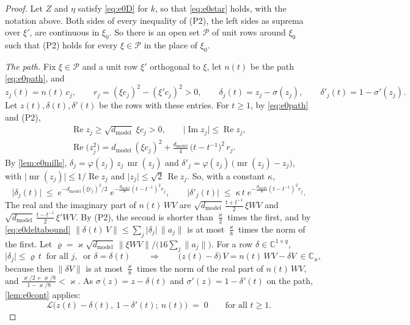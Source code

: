 \documentclass[10pt]{article}
\theoremstyle{definition}
\theoremstyle{remark}
\newcommand{\dm}{d_{\mathrm{model}}}
\newcommand{\norm}[1]{\lVert #1\rVert}
\begin{document}
\begin{proof}
Let $Z$ and $\eta$ satisfy \eqref{eq:e0D} for $k$, so that \eqref{eq:e0star} holds, with the notation above. Both sides of every inequality of (P2), the left sides as suprema over $\xi'$, are continuous in $\xi_0$. So there is an open set $\mathcal P$ of unit rows around $\xi_0$ such that (P2) holds for every $\xi \in \mathcal P$ in the place of $\xi_0$.

\emph{The path.} Fix $\xi \in \mathcal P$ and a unit row $\xi'$ orthogonal to $\xi$, let $n(t)$ be the path \eqref{eq:e0path}, and
\[
z_j(t) = n(t)\,c_j, \qquad r_j = (\xi c_j)^2 - (\xi'c_j)^2 > 0, \qquad \delta_j(t) = z_j - \sigma(z_j), \qquad \delta'_j(t) = 1 - \sigma'(z_j).
\]
Let $z(t), \delta(t), \delta'(t)$ be the rows with these entries. For $t \ge 1$, by \eqref{eq:e0path} and (P2),
\begin{equation}\label{eq:e0zfacts}
\begin{gathered}
\operatorname{Re}z_j \ge \sqrt{\dm}\;\xi c_j > 0, \qquad \lvert\operatorname{Im}z_j\rvert \le \operatorname{Re}z_j, \\
\operatorname{Re}\big(z_j^2\big) = \dm\,(\xi c_j)^2 + \frac{\dm}{4}\,\big(t - t^{-1}\big)^2\,r_j .
\end{gathered}
\end{equation}
By \cref{lem:e0mills}, $\delta_j = \varphi(z_j)\,z_j\,\operatorname{mr}(z_j)$ and $\delta'_j = \varphi(z_j)\,\big(\operatorname{mr}(z_j) - z_j\big)$, with $\lvert\operatorname{mr}(z_j)\rvert \le 1/\operatorname{Re}z_j$ and $\lvert z_j\rvert \le \sqrt2\,\operatorname{Re}z_j$. So, with a constant $\kappa$,
\begin{equation}\label{eq:e0deltabound}
\lvert\delta_j(t)\rvert \;\le\; e^{-\dm(\xi c_j)^2/2}\;e^{-\frac{\dm}{8}(t - t^{-1})^2r_j}, \qquad \lvert\delta'_j(t)\rvert \;\le\; \kappa\,t\;e^{-\frac{\dm}{8}(t - t^{-1})^2r_j} .
\end{equation}
The real and the imaginary part of $n(t)\,WV$ are $\sqrt{\dm}\,\frac{t + t^{-1}}{2}\,\xi WV$ and $\sqrt{\dm}\,\frac{t - t^{-1}}{2}\,\xi'WV$. By (P2), the second is shorter than $\frac{\varkappa}{2}$ times the first, and by \eqref{eq:e0deltabound} $\norm{\delta(t)\,V} \le \sum_j\lvert\delta_j\rvert\,\norm{a_j}$ is at most $\frac{\varkappa}{8}$ times the norm of the first. Let $\varrho = \varkappa\sqrt{\dm}\,\norm{\xi WV}\big/\big(16\sum_j\norm{a_j}\big)$. For a row $\delta \in \mathbb C^{1\times q}$,
\begin{equation}\label{eq:e0incone}
\lvert\delta_j\rvert \le \varrho\,t \ \text{ for all } j, \ \text{ or } \delta = \delta(t) \qquad\Longrightarrow\qquad \big(z(t) - \delta\big)\,V = n(t)\,WV - \delta V \ \in \mathbb C_\varkappa,
\end{equation}
because then $\norm{\delta V}$ is at most $\frac{\varkappa}{8}$ times the norm of the real part of $n(t)\,WV$, and $\frac{\varkappa/2 + \varkappa/8}{1 - \varkappa/8} < \varkappa$. As $\sigma(z) = z - \delta(t)$ and $\sigma'(z) = 1 - \delta'(t)$ on the path, \cref{lem:e0cont} applies:
\begin{equation}\label{eq:e0gelupath}
\mathcal L\big(z(t) - \delta(t),\ 1 - \delta'(t);\ n(t)\big) \;=\; 0 \qquad\text{for all } t \ge 1 .
\end{equation}


\end{proof}
\end{document}
